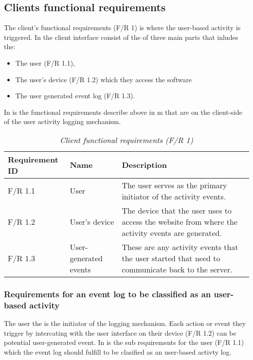 \clearpage

\subsection{Clients functional requirements}

The client's functional requirements (F/R 1) is where the user-based activity is triggered. In  the client interface consist of the of three main parts that inludes the:

\begin{itemize}
	\item The user (F/R 1.1),
	\item The user's device (F/R 1.2) which they access the software
	\item The user generated event log (F/R 1.3).
\end{itemize}

In  is the functional requirements describe above in m that are on the client-side of the user activity logging mechanism.

\begin{table}[!htb]
	\centering
	\small
	\caption[Client functional requirements]
	{\textit{Client functional requirements (F/R 1)}}
	\label{tbl:Ch2_Client_Functional_Requirements}
	\begin{tabularx}{\textwidth}{|l|l|X|}
		\hline \textbf{Requirement ID} & \textbf{Name} & \textbf{Description} \\
		\hline F/R 1.1 & User & The user serves as the primary initiator of the activity events.\\
		\hline F/R 1.2 & User's device & The device that the user uses to access the website from where the activity events are generated.\\
		\hline F/R 1.3 & User-generated events & These are any activity events that the user started that need to communicate back to the server.\\
		\hline
	\end{tabularx}
\end{table}

\subsubsection{Requirements for an event log to be classified as an user-based activity}
The user the is the initiator of the logging mechanism. Each action or event they trigger by intercating with the user interface on their device (F/R 1.2) can be potential user-generated event. In  is the sub requirements for the user (F/R 1.1) which the event log should fulfill to be clasified as an user-based activty log.

